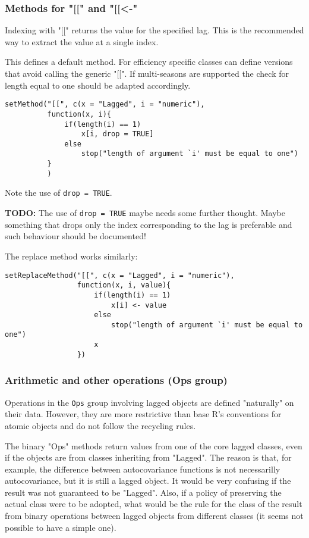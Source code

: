 \documentclass[11pt,a4paper]{article}
\begin{document}
\subsubsection{Methods for "[[" and "[[<-"}
\label{sec:org24a9d23}

Indexing with "[[" returns the value for the specified lag. This is the recommended way to
extract the value at a single index.

This defines a default method. For efficiency specific classes can define versions that avoid
calling the generic "[[". If multi-seasons are supported the check for length equal to one
should be adapted accordingly.
\begin{verbatim}
setMethod("[[", c(x = "Lagged", i = "numeric"),
          function(x, i){
              if(length(i) == 1)
                  x[i, drop = TRUE]
              else
                  stop("length of argument `i' must be equal to one")
          }
          )
\end{verbatim}
Note the use of \texttt{drop = TRUE}.


\textbf{TODO:} The use of \texttt{drop = TRUE} maybe needs some further thought. Maybe something that drops
only the index corresponding to the lag is preferable and such behaviour should be documented!

The replace method works similarly:
\begin{verbatim}
setReplaceMethod("[[", c(x = "Lagged", i = "numeric"),
                 function(x, i, value){
                     if(length(i) == 1)
                         x[i] <- value
                     else
                         stop("length of argument `i' must be equal to one")
                     x
                 })
\end{verbatim}



\subsubsection{Arithmetic and other operations (Ops group)}
\label{sec:org0a34409}

Operations in the \texttt{Ops} group involving lagged objects are defined "naturally" on their
data. However, they are more restrictive than base R's conventions for atomic objects and do
not follow the recycling rules.

The binary "Ops" methods return values from one of the core lagged classes, even if the
objects are from classes inheriting from "Lagged". The reason is that, for example, the
difference between autocovariance functions is not necessarilly autocovariance, but it is
still a lagged object. It would be very confusing if the result was not guaranteed to be
"Lagged".  Also, if a policy of preserving the actual class were to be adopted, what would
be the rule for the class of the result from binary operations between lagged objects from
different classes (it seems not possible to have a simple one). 
\end{document}
